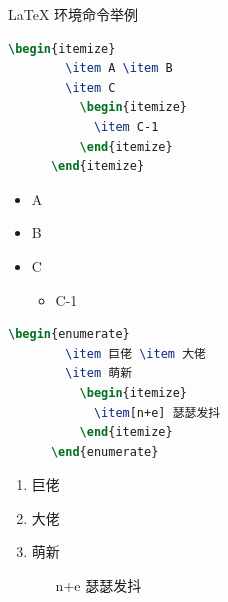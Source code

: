 \documentclass[UTF8, fontset=fandol]{beamer}
\begin{document}
  \begin{frame}[fragile]{\LaTeX{} 环境命令举例}
    \begin{minipage}{0.5\linewidth}
      \begin{lstlisting}[language=TeX]
      \begin{itemize}
        \item A \item B
        \item C
          \begin{itemize}
            \item C-1
          \end{itemize}
      \end{itemize}
      \end{lstlisting}
    \end{minipage}\hspace{1cm}
    \begin{minipage}{0.3\linewidth}
      \begin{itemize}
        \item A
        \item B
        \item C
          \begin{itemize}
            \item C-1
          \end{itemize}
      \end{itemize}
    \end{minipage}
    \medskip
    \pause
    \begin{minipage}{0.5\linewidth}
      \begin{lstlisting}[language=TeX]
      \begin{enumerate}
        \item 巨佬 \item 大佬
        \item 萌新
          \begin{itemize}
            \item[n+e] 瑟瑟发抖
          \end{itemize}
      \end{enumerate}
      \end{lstlisting}
    \end{minipage}\hspace{1cm}
    \begin{minipage}{0.3\linewidth}
      \begin{enumerate}
        \item 巨佬
        \item 大佬
        \item 萌新
          \begin{itemize}
            \item[n+e] 瑟瑟发抖
          \end{itemize}
      \end{enumerate}
    \end{minipage}
  \end{frame}
\end{document}
